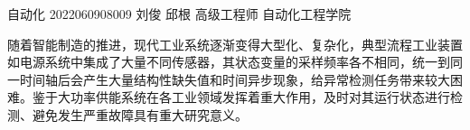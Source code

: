 \documentclass[bachelor, vlined]{DissertUESTC}
\begin{document}
	




	


	{自动化}
	{2022060908009}
	{刘俊}
	{邱根}
	{高级工程师}
	{自动化工程学院}  %
    

	\zhabstract
	
	随着智能制造的推进，现代工业系统逐渐变得大型化、复杂化，典型流程工业装置如电源系统中集成了大量不同传感器，其状态变量的采样频率各不相同，统一到同一时间轴后会产生大量结构性缺失值和时间异步现象，给异常检测任务带来较大困难。鉴于大功率供能系统在各工业领域发挥着重大作用，及时对其运行状态进行检测、避免发生严重故障具有重大研究意义。
\end{document}
